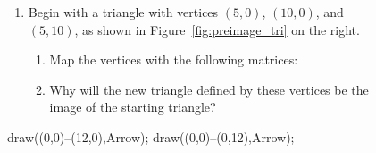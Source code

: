 \documentclass[../textbook.tex]{subfiles}
\begin{document}
\newcommand{\mtrxtbt}[4] {$\left[\begin{array}{cc}#1 & #2 \\ #3 & #4 \end{array}\right]$}

\begin{figure}[h]
	\begin{center}
		\begin{minipage}[c]{0.55\textwidth}
			\begin{enumerate}
				\setcounter{enumi}{\value{mp_problem_i}}
				\item Begin with a triangle with vertices $(5,0)$, $(10,0)$, and $(5,10)$, as shown in Figure~\ref{fig:preimage_tri} on the right. %
				\begin{enumerate}
					\item Map the vertices with the following matrices:
					\begin{enumerate}
						\begin{multicols}{2}\raggedcolumns
							\item $\left[\begin{array}{cc}1 & 0 \\ 0 & 1 \end{array}\right]$
							\item $\left[\begin{array}{cc}.6 & -.8 \\ .8 & .6 \end{array}\right]$
							\item $\left[\begin{array}{cc}.6 & .8 \\ .8 & -.6 \end{array}\right]$
						\end{multicols}
					\end{enumerate}
					\item Why will the new triangle defined by these vertices be the image of the starting triangle?
					
					\setcounter{another_name}{\value{enumii}}
				\end{enumerate}
				\setcounter{mp_problem_i}{\value{enumi}}
			\end{enumerate}
		\end{minipage}
		\hfill
		\begin{minipage}[c]{0.35\textwidth}
			\begin{center}
				\begin{minipage}[b]{\textwidth}
					\centering
					\begin{asy}[width=0.7\textwidth]
						draw((0,0)--(12,0),Arrow);
						draw((0,0)--(0,12),Arrow);
						

\end{asy}
\end{minipage}
\end{center}
\end{minipage}
\end{center}
\end{figure}
\end{document}
